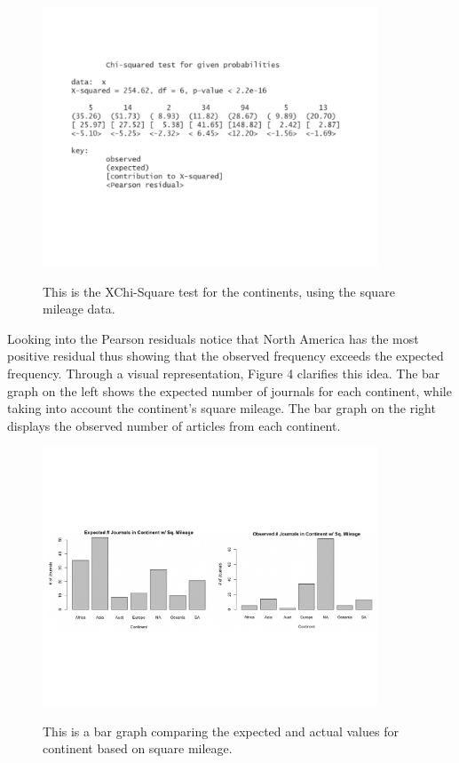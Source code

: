 \documentclass[12pt, letterpaper]{article}
\begin{document}
\begin{figure}[!h]
\begin{center}
\includegraphics[width=10cm]{ContinentChiSquare2.pdf}
\label{fig: Continent XChi-Square with Square Mileage}
\caption{This is the XChi-Square test for the continents, using the square mileage data.}
\end{center}
\end{figure}

Looking into the Pearson residuals notice that North America has the most positive residual thus showing that the observed frequency exceeds the expected frequency. Through a visual representation, Figure 4 clarifies this idea. The bar graph on the left shows the expected number of journals for each continent, while taking into account the continent's square mileage. The bar graph on the right displays the observed number of articles from each continent.
\begin{figure}[h]
\begin{center}
\includegraphics[width=10cm]{Continent2BarGraphFixed.pdf}
\label{fig: Continent Bar Graph}
\caption{This is a bar graph comparing the expected and actual values for continent based on square mileage.}
\end{center}
\end{figure}
\end{document}
